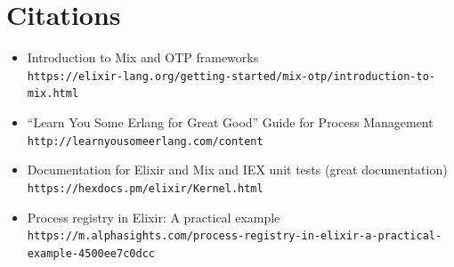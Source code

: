 \documentclass[letterpaper]{article}
\begin{document}
	\section{Citations}

	\begin{itemize}

		\item Introduction to Mix and OTP frameworks\\
		\verb|https://elixir-lang.org/getting-started/mix-otp/introduction-to-mix.html|

		\item ``Learn You Some Erlang for Great Good'' Guide for Process Management\\
		\verb|http://learnyousomeerlang.com/content|

		\item Documentation for Elixir and Mix and IEX unit tests (great documentation)\\
		\verb|https://hexdocs.pm/elixir/Kernel.html|

		\item Process registry in Elixir: A practical example\\
		\verb|https://m.alphasights.com/process-registry-in-elixir-a-practical-example-4500ee7c0dcc|

	\end{itemize}
\end{document}
